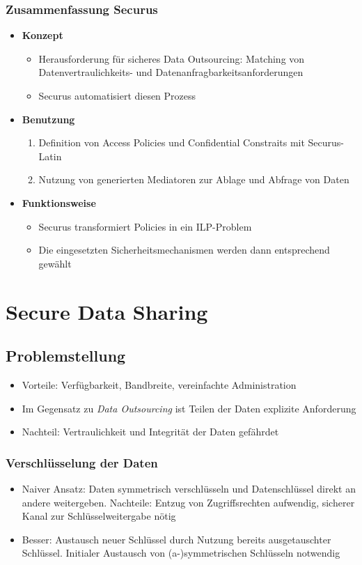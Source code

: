 \subsubsection{Zusammenfassung Securus}
\begin{itemize}
	\item \textbf{Konzept}
	\begin{itemize}
		\item Herausforderung für sicheres Data Outsourcing: Matching von Datenvertraulichkeits- und Datenanfragbarkeitsanforderungen
		\item Securus automatisiert diesen Prozess
	\end{itemize}
	\item \textbf{Benutzung}
	\begin{enumerate}
		\item Definition von Access Policies und Confidential Constraits mit Securus-Latin
		\item Nutzung von generierten Mediatoren zur Ablage und Abfrage von Daten
	\end{enumerate}
	\item \textbf{Funktionsweise}
	\begin{itemize}
		\item Securus transformiert Policies in ein ILP-Problem
		\item Die eingesetzten Sicherheitsmechanismen werden dann entsprechend gewählt
	\end{itemize}
\end{itemize}



\section{Secure Data Sharing}

\subsection{Problemstellung}
\begin{itemize}
	\item Vorteile: Verfügbarkeit, Bandbreite, vereinfachte Administration
	\item Im Gegensatz zu \textit{Data Outsourcing} ist Teilen der Daten explizite Anforderung
	\item Nachteil: Vertraulichkeit und Integrität der Daten gefährdet
\end{itemize}

\subsubsection{Verschlüsselung der Daten}
\begin{itemize}
	\item Naiver Ansatz: Daten symmetrisch verschlüsseln und Datenschlüssel direkt an andere weitergeben. Nachteile: Entzug von Zugriffsrechten aufwendig, sicherer Kanal zur Schlüsselweitergabe nötig
	\item Besser: Austausch neuer Schlüssel durch Nutzung bereits ausgetauschter Schlüssel. Initialer Austausch von (a-)symmetrischen Schlüsseln notwendig
\end{itemize}


